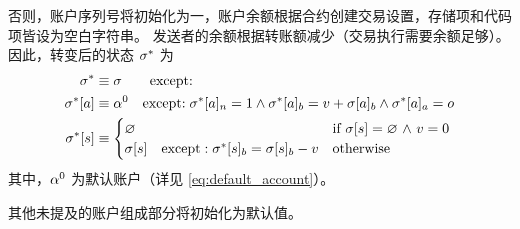否则，账户序列号将初始化为一，账户余额根据合约创建交易设置，存储项和代码项皆设为空白字符串。
发送者的余额根据转账额减少（交易执行需要余额足够）。
因此，转变后的状态 $\mathbf{\sigma}^*$ 为
\begin{align}
	\mathbf{\sigma}^* & \equiv \mathbf{\sigma} \qquad{ \text{except:}}\\
	\mathbf{\sigma}^*[a] &\equiv \mathbf{\alpha}^0 \quad\text{except:}\; \mathbf{\sigma}^*[a]_n=1 \wedge \mathbf{\sigma}^*[a]_b=v+\mathbf{\sigma}[a]_b \wedge \mathbf{\sigma}^*[a]_a=o\\
	\mathbf{\sigma}^*[s] &\equiv \begin{cases}
		\varnothing & \mbox{if $\mathbf{\sigma}[s]=\varnothing$ $\land$ $v=0$}\\
		\mathbf{\sigma}[s]\quad\mbox{except}:	\mathbf{\sigma}^*[s]_b=\mathbf{\sigma}[s]_b-v	& \mbox{otherwise}
	\end{cases}
\end{align}
其中，$\mathbf{\alpha}^0$ 为默认账户（详见 \cref{eq:default_account}）。

其他未提及的账户组成部分将初始化为默认值。

